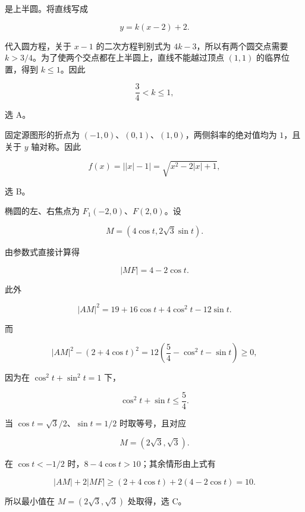 \begin{answer}
是上半圆。将直线写成

\nopagebreak[4]
\[
y=k(x-2)+2.
\]

代入圆方程，关于 $x-1$ 的二次方程判别式为 $4k-3$，所以有两个圆交点需要 $k>3/4$。为了使两个交点都在上半圆上，直线不能越过顶点 $(1,1)$ 的临界位置，得到 $k\le1$。因此

\nopagebreak[4]
\[
\frac34<k\le1,
\]

选 A。


固定源图形的折点为 $(-1,0)$、$(0,1)$、$(1,0)$，两侧斜率的绝对值均为 $1$，且关于 $y$ 轴对称。因此

\nopagebreak[4]
\[
f(x)=\bigl||x|-1\bigr|
=\sqrt{x^2-2|x|+1},
\]

选 B。


椭圆的左、右焦点为 $F_1(-2,0)$、$F(2,0)$。设

\nopagebreak[4]
\[
M=(4\cos t,2\sqrt3\sin t).
\]

由参数式直接计算得

\nopagebreak[4]
\[
|MF|=4-2\cos t.
\]

此外

\nopagebreak[4]
\[
|AM|^2
=19+16\cos t+4\cos^2t-12\sin t.
\]

而

\nopagebreak[4]
\[
|AM|^2-(2+4\cos t)^2
=12\left(\frac54-\cos^2t-\sin t\right)\ge0,
\]

因为在 $\cos^2t+\sin^2t=1$ 下，

\nopagebreak[4]
\[
\cos^2t+\sin t\le\frac54.
\]

当 $\cos t=\sqrt3/2$、$\sin t=1/2$ 时取等号，且对应

\nopagebreak[4]
\[
M=(2\sqrt3,\sqrt3).
\]

在 $\cos t<-1/2$ 时，$8-4\cos t>10$；其余情形由上式有

\nopagebreak[4]
\[
|AM|+2|MF|
\ge(2+4\cos t)+2(4-2\cos t)=10.
\]

所以最小值在 $M=(2\sqrt3,\sqrt3)$ 处取得，选 C。





\end{answer}

